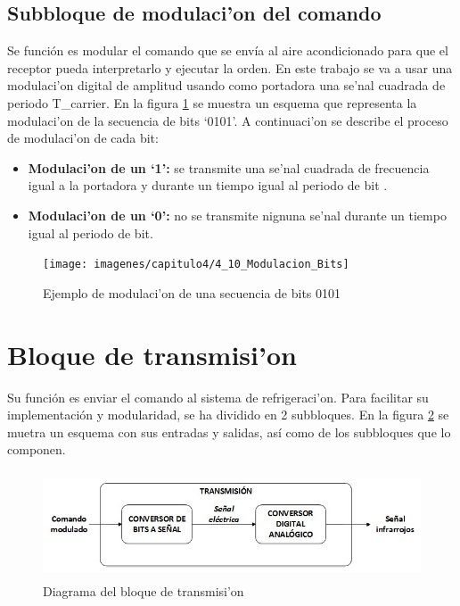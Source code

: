 {\subsection{Subbloque de modulaci'on del comando}\label{subsec:modulacion}

	Se función es modular el comando que se envía al aire acondicionado para que el receptor pueda interpretarlo y ejecutar la orden. En este trabajo se va a usar una modulaci'on digital de amplitud usando como portadora una se'nal cuadrada de periodo T\_carrier. En la figura \ref{4_10:modulacion_bits} se muestra un esquema que representa la modulaci'on de la secuencia de bits `0101'.  A continuaci'on se describe el proceso de modulaci'on de cada bit: 

\begin{itemize}
    \item\textbf{Modulaci'on de un `1':} se transmite una se'nal cuadrada de frecuencia igual a la portadora y durante un tiempo igual al periodo de bit . 
    \item\textbf{Modulaci'on de un `0':} no se transmite nignuna se'nal durante un tiempo igual al periodo de bit. 
\end{itemize}

\begin{figure}[htbp]
  \centering
  \texttt{[image: imagenes/capitulo4/4\_10\_Modulacion\_Bits]}
   \caption{Ejemplo de modulaci'on de una secuencia de bits 0101}
   \label{4_10:modulacion_bits}
\end{figure}


\section{Bloque de transmisi'on}\label{sec:transmision}

	Su función es enviar el comando al sistema de refrigeraci'on. Para facilitar su implementación y modularidad, se ha dividido en 2 subbloques. En la figura \ref{4_11:diag_transmision} se muetra un esquema con sus entradas y salidas, así como de los subbloques que lo componen. 

\begin{figure}[htbp]
  \centering
  \includegraphics[width=140mm, height=32mm]{imagenes/capitulo4/4_11Bloque_Transmision}
   \caption{Diagrama del bloque de transmisi'on}
   \label{4_11:diag_transmision}
\end{figure}

}
